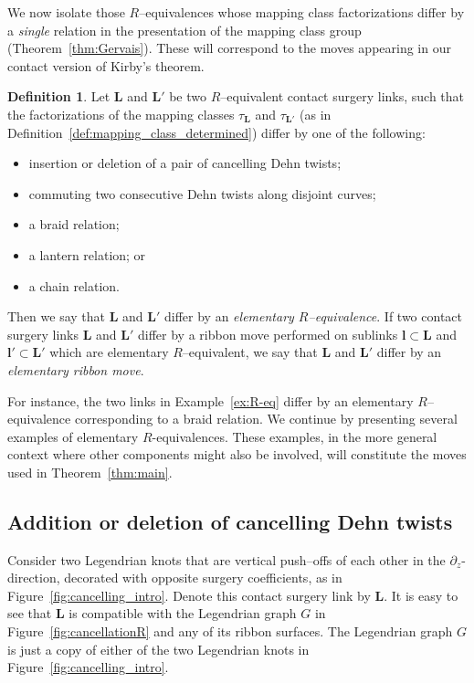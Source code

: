 \documentclass{amsart}
\numberwithin{equation}{section}
\numberwithin{figure}{section}
\theoremstyle{definition}
\newtheorem{definition}[theorem]{Definition}
\theoremstyle{remark}
\let\oldtau\tau
\renewcommand{\tau}{\oldtau}
\begin{document}
We now isolate those $R$–equivalences whose mapping class factorizations differ by a \emph{single} relation in the presentation of the mapping class group (Theorem~\ref{thm:Gervais}). These will correspond to the moves appearing in our contact version of Kirby's theorem.

\begin{definition}
  Let $\boldsymbol{L}$ and $\boldsymbol{L}'$ be two $R$–equivalent contact surgery links, such that the factorizations of the mapping classes $\tau_{\scriptscriptstyle{\boldsymbol{L}}}$ and $\tau_{\scriptscriptstyle{\boldsymbol{L}'}}$ (as in Definition~\ref{def:mapping_class_determined}) differ by one of the following:
  \begin{itemize}
    \item insertion or deletion of a pair of cancelling Dehn twists;
    \item commuting two consecutive Dehn twists along disjoint curves;
    \item a braid relation;
    \item a lantern relation; or
    \item a chain relation.
  \end{itemize}
  Then we say that $\boldsymbol{L}$ and $\boldsymbol{L}'$ differ by an \emph{elementary $R$–equivalence}.
If two contact surgery links $\boldsymbol{L}$ and $\boldsymbol{L}'$ differ by a ribbon move performed on sublinks $\boldsymbol{l}\subset\boldsymbol{L}$ and $\boldsymbol{l}'\subset\boldsymbol{L}'$ which are elementary $R$–equivalent, we say that $\boldsymbol{L}$ and $\boldsymbol{L}'$ differ by an \emph{elementary ribbon move}.
\end{definition}

For instance, the two links in Example~\ref{ex:R-eq} differ by an elementary $R$–equivalence corresponding to a braid relation.
We continue by presenting several examples of elementary \(R\)-equivalences. These examples, in the more general context where other components might also be involved, will constitute the moves used in Theorem~\ref{thm:main}.

\subsection{Addition or deletion of cancelling Dehn twists}\label{cancellationEX}
  Consider two Legendrian knots that are vertical push–offs of each other in the $\partial_z$-direction, decorated with opposite surgery coefficients, as in Figure~\ref{fig:cancelling_intro}. Denote this contact surgery link by $\boldsymbol{L}$.
  It is easy to see that $\boldsymbol{L}$ is compatible with the Legendrian graph $G$ in Figure~\ref{fig:cancellationR} and any of its ribbon surfaces. The Legendrian graph $G$ is just a copy of either of the two Legendrian knots in Figure~\ref{fig:cancelling_intro}.
\end{document}
